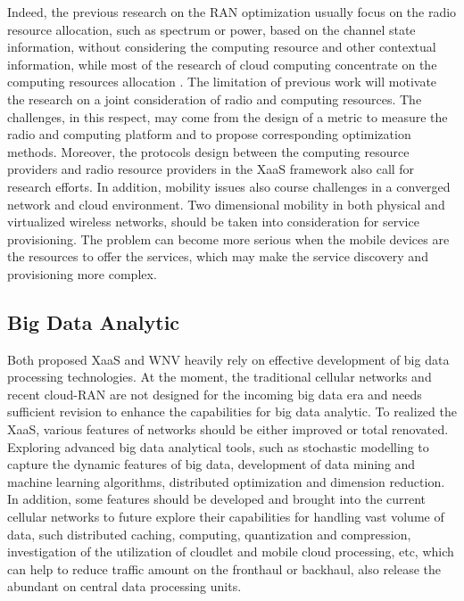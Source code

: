 \documentclass[12pt,draftclsnofoot,onecolumn]{IEEEtran}
\begin{document}
Indeed, the previous research on the RAN optimization usually
focus on the radio resource allocation, such as spectrum or power,
based on the channel state information, without considering the
computing resource and other contextual information, while most of
the research of cloud computing concentrate on the computing
resources allocation \cite{Duan1}. The limitation of previous work will
motivate the research on a joint consideration of radio and
computing resources. The challenges, in this respect, may come
from the design of a metric to measure the radio and computing
platform and to propose corresponding optimization methods. Moreover, the
protocols design between the computing resource providers and radio
resource providers in the XaaS framework also call for research
efforts. In addition, mobility issues also course challenges in a
converged network and cloud environment. Two dimensional mobility
in both physical and virtualized wireless networks, should be taken into
consideration for service provisioning. The problem can become
more serious when the mobile devices are the resources to offer
the services, which may make the service discovery and
provisioning more complex.\par


\subsection{Big Data Analytic}
Both proposed XaaS and WNV heavily rely on effective development
of big data processing technologies. At the moment, the
traditional cellular networks and recent cloud-RAN are not
designed for the incoming big data era and needs sufficient
revision to enhance the capabilities for big data analytic. To
realized the XaaS, various features of networks should be either
improved or total renovated. Exploring advanced big data
analytical tools, such as stochastic modelling to capture the
dynamic features of big data, development of data mining and
machine learning algorithms, distributed optimization and
dimension reduction. In addition, some features should be
developed and brought into the current cellular networks to future
explore their capabilities for handling vast volume of data, such
distributed caching, computing, quantization and compression,
investigation of the utilization of cloudlet and mobile cloud
processing, etc, which can help to reduce traffic amount on the
fronthaul or backhaul, also release the abundant on central data
processing units.
\end{document}
